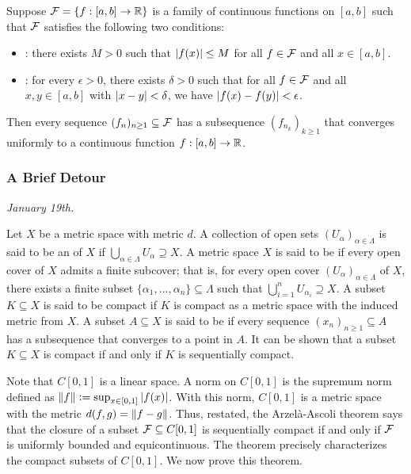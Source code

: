 \begin{theorem}
    Suppose $\mathcal{F} = \{f : [a,b] \to \mathbb{R}\}$ is a family of continuous functions on $[a,b]$ such that $\mathcal{F}$ satisfies the following two conditions:
    \begin{itemize}
        \item {}: there exists $M > 0$ such that $\left| f(x) \right| \leq M$ for all $f \in \mathcal{F}$ and all $x \in [a,b]$.
        \item {}: for every $\epsilon > 0$, there exists $\delta > 0$ such that for all $f \in \mathcal{F}$ and all $x, y \in [a,b]$ with $\left| x - y \right| < \delta$, we have $\left| f(x) - f(y) \right| < \epsilon$.
    \end{itemize}
    Then every sequence $(f_{n})_{n \geq 1} \subseteq \mathcal{F}$ has a subsequence $(f_{n_{k}})_{k \geq 1}$ that converges uniformly to a continuous function $f:[a,b] \to \mathbb{R}$.
\end{theorem}


\subsubsection{A Brief Detour}
\textit{January 19th.}

Let $X$ be a metric space with metric $d$. A collection of open sets $(U_{\alpha})_{\alpha \in \Lambda}$ is said to be an  of $X$ if $\bigcup_{\alpha \in \Lambda} U_{\alpha} \supseteq X$. A metric space $X$ is said to be  if every open cover of $X$ admits a finite subcover; that is, for every open cover $(U_{\alpha})_{\alpha \in \Lambda}$ of $X$, there exists a finite subset $\{\alpha_{1}, \ldots, \alpha_{n}\} \subseteq \Lambda$ such that $\bigcup_{i=1}^{n} U_{\alpha_{i}} \supseteq X$. A subset $K \subseteq X$ is said to be compact if $K$ is compact as a metric space with the induced metric from $X$. A subset $A \subseteq X$ is said to be  if every sequence $(x_{n})_{n \geq 1} \subseteq A$ has a subsequence that converges to a point in $A$. It can be shown that a subset $K \subseteq X$ is compact if and only if $K$ is sequentially compact.

Note that $C[0,1]$ is a linear space. A norm on $C[0,1]$ is the supremum norm defined as $\left\lVert f\right\rVert \vcentcolon= \sup_{x \in [0,1]} \left| f(x) \right|$. With this norm, $C[0,1]$ is a metric space with the metric $d(f,g) = \left\lVert f-g\right\rVert$. Thus, restated, the Arzelà-Ascoli theorem says that the closure of a subset $\mathcal{F} \subseteq C[0,1]$ is sequentially compact if and only if $\mathcal{F}$ is uniformly bounded and equicontinuous. The theorem precisely characterizes the compact subsets of $C[0,1]$. We now prove this theorem.

